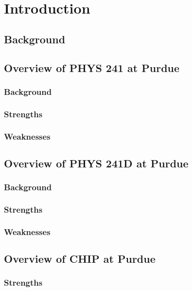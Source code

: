\chapter[Chapter 1: Introduction]{Introduction}

\section{Background}

\section{Overview of PHYS 241 at Purdue}

\subsection{Background}
\subsection{Strengths}
\subsection{Weaknesses}

\section{Overview of PHYS 241D at Purdue}

\subsection{Background}
\subsection{Strengths}
\subsection{Weaknesses}

\section{Overview of CHIP at Purdue}

\subsection{Strengths}

